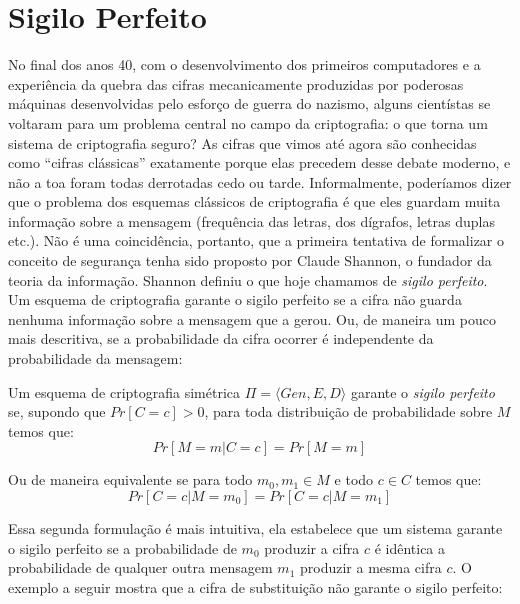 ﻿\chapter{Sigilo Perfeito}
\label{cha:sigilo-perfeito}

No final dos anos 40, com o desenvolvimento dos primeiros computadores e a experiência da quebra das cifras mecanicamente produzidas por poderosas máquinas desenvolvidas pelo esforço de guerra do nazismo, alguns cientístas se voltaram para um problema central no campo da criptografia: o que torna um sistema de criptografia seguro?
As cifras que vimos até agora são conhecidas como ``cifras clássicas'' exatamente porque elas precedem desse debate moderno, e não a toa foram todas derrotadas cedo ou tarde.
Informalmente, poderíamos dizer que o problema dos esquemas clássicos de criptografia é que eles guardam muita informação sobre a mensagem (frequência das letras, dos dígrafos, letras duplas etc.). 
Não é uma coincidência, portanto, que a primeira tentativa de formalizar o conceito de segurança tenha sido proposto por Claude Shannon, o fundador da teoria da informação.
Shannon definiu o que hoje chamamos de {\em sigilo perfeito}.
Um esquema de criptografia garante o sigilo perfeito se a cifra não guarda nenhuma informação sobre a mensagem que a gerou.
Ou, de maneira um pouco mais descritiva, se a probabilidade da cifra ocorrer é independente da probabilidade da mensagem:

\begin{definition}
  Um esquema de criptografia simétrica $\Pi = \langle Gen, E, D \rangle$ garante o {\em sigilo perfeito} se, supondo que $Pr[C=c] > 0$, para toda distribuição de probabilidade sobre $M$ temos que:
\begin{displaymath}
  Pr[M = m | C = c] = Pr[M = m]
\end{displaymath}

Ou de maneira equivalente se para todo $m_0, m_1 \in M$ e todo $c \in C$ temos que:
\begin{displaymath}
  Pr[C = c | M = m_0] = Pr[C = c | M = m_1]
\end{displaymath}
\end{definition}

Essa segunda formulação é mais intuitiva, ela estabelece que um sistema garante o sigilo perfeito se a probabilidade de $m_0$ produzir a cifra $c$ é idêntica a probabilidade de qualquer outra mensagem $m_1$ produzir a mesma cifra $c$.
O exemplo a seguir mostra que a cifra de substituição não garante o sigilo perfeito:

